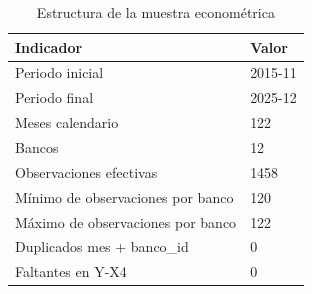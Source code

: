 \begin{table}
\caption{Estructura de la muestra econométrica}
\label{tab:estructura_muestra}
\begin{tabular}{ll}
\toprule
Indicador & Valor \\
\midrule
Periodo inicial & 2015-11 \\
Periodo final & 2025-12 \\
Meses calendario & 122 \\
Bancos & 12 \\
Observaciones efectivas & 1458 \\
Mínimo de observaciones por banco & 120 \\
Máximo de observaciones por banco & 122 \\
Duplicados mes + banco\_id & 0 \\
Faltantes en Y-X4 & 0 \\
\bottomrule
\end{tabular}
\end{table}
